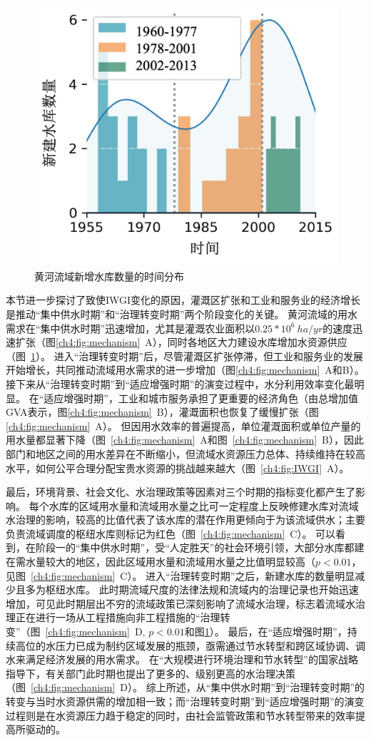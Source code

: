 \begin{figure}[tb]
    \centering
    \includegraphics[width=0.6\linewidth]{img/ch4/ch4_reservoirs.png}
    \caption{黄河流域新增水库数量的时间分布}\label{ch4:fig:reservoirs}
\end{figure}


本节进一步探讨了致使IWGI变化的原因，灌溉区扩张和工业和服务业的经济增长是推动“集中供水时期”和“治理转变时期”两个阶段变化的关键。
黄河流域的用水需求在“集中供水时期”迅速增加，尤其是灌溉农业面积以$0.25*10^6~ha/yr$的速度迅速扩张（图\ref{ch4:fig:mechanism}~A），同时各地区大力建设水库增加水资源供应（图~\ref{ch4:fig:reservoirs}）。
进入“治理转变时期”后，尽管灌溉区扩张停滞，但工业和服务业的发展开始增长，共同推动流域用水需求的进一步增加（图\ref{ch4:fig:mechanism}~A和B）。
接下来从“治理转变时期”到“适应增强时期”的演变过程中，水分利用效率变化最明显。
在“适应增强时期”，工业和城市服务承担了更重要的经济角色（由总增加值GVA表示，图\ref{ch4:fig:mechanism}~B），灌溉面积也恢复了缓慢扩张（图\ref{ch4:fig:mechanism}~A）。
但因用水效率的普遍提高，单位灌溉面积或单位产量的用水量都显著下降（图~\ref{ch4:fig:mechanism}~A和图~\ref{ch4:fig:mechanism}~B），因此部门和地区之间的用水差异在不断缩小，但流域水资源压力总体、持续维持在较高水平，如何公平合理分配宝贵水资源的挑战越来越大（图~\ref{ch4:fig:IWGI}~A）。

最后，环境背景、社会文化、水治理政策等因素对三个时期的指标变化都产生了影响。
每个水库的区域用水量和流域用水量之比可一定程度上反映修建水库对流域水治理的影响，较高的比值代表了该水库的潜在作用更倾向于为该流域供水；主要负责流域调度的枢纽水库则标记为红色（图~\ref{ch4:fig:mechanism}~C）。
可以看到，在阶段一的“集中供水时期”，受“人定胜天”的社会环境引领，大部分水库都建在需水量较大的地区，因此区域用水量和流域用水量之比值明显较高（$p<0.01$，见图~\ref{ch4:fig:mechanism}~C）。
进入“治理转变时期”之后，新建水库的数量明显减少且多为枢纽水库。
此时期流域尺度的法律法规和流域内的治理记录也开始迅速增加，可见此时期层出不穷的流域政策已深刻影响了流域水治理，标志着流域水治理正在进行一场从工程措施向非工程措施的“治理转变”（图~\ref{ch4:fig:mechanism}~D, $p<0.01$和图\ref{ch4:fig:reservoirs}）。
最后，在“适应增强时期”，持续高位的水压力已成为制约区域发展的瓶颈，亟需通过节水转型和跨区域协调、调水来满足经济发展的用水需求。
在“大规模进行环境治理和节水转型”的国家战略指导下，有关部门此时期也提出了更多的、级别更高的水治理决策（图~\ref{ch4:fig:mechanism}~D）。
综上所述，从“集中供水时期”到“治理转变时期”的转变与当时水资源供需的增加相一致；而“治理转变时期”到“适应增强时期”的演变过程则是在水资源压力趋于稳定的同时，由社会监管政策和节水转型带来的效率提高所驱动的。
